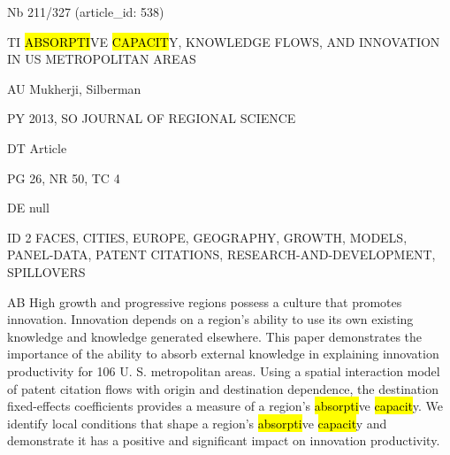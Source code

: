 \documentclass[a4paper]{article}
\begin{document}
\vspace*{-2cm}
Nb \tabto{0cm}211/327 (article\_id: 538)\par
TI \tabto{0cm}\hl{ABSORPTI}VE \hl{CAPACIT}Y, KNOWLEDGE FLOWS, AND INNOVATION IN US METROPOLITAN AREAS\par
AU \tabto{0cm}Mukherji, Silberman\par
PY \tabto{0cm}2013, SO JOURNAL OF REGIONAL SCIENCE\par
DT \tabto{0cm}Article\par
PG \tabto{0cm}26, NR 50, TC 4\par
DE \tabto{0cm}null\par
ID \tabto{0cm}2 FACES, CITIES, EUROPE, GEOGRAPHY, GROWTH, MODELS, PANEL-DATA, PATENT CITATIONS, RESEARCH-AND-DEVELOPMENT, SPILLOVERS\par
AB \tabto{0cm}High growth and progressive regions possess a culture that promotes innovation. Innovation depends on a region's ability to use its own existing knowledge and knowledge generated elsewhere. This paper demonstrates the importance of the ability to absorb external knowledge in explaining innovation productivity for 106 U. S. metropolitan areas. Using a spatial interaction model of patent citation flows with origin and destination dependence, the destination fixed-effects coefficients provides a measure of a region's \hl{absorpti}ve \hl{capacit}y. We identify local conditions that shape a region's \hl{absorpti}ve \hl{capacit}y and demonstrate it has a positive and significant impact on innovation productivity.\par
\clearpage
\end{document}
